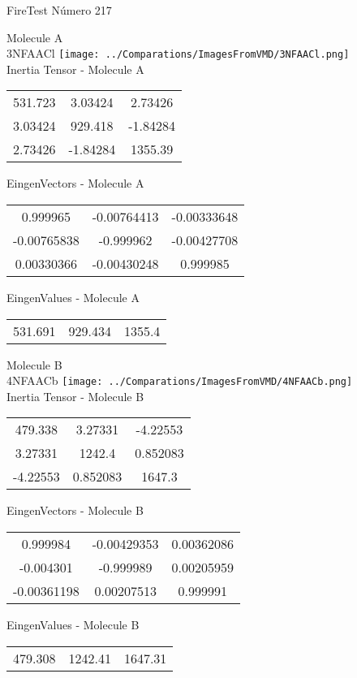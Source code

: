\vtab[-2cm]
\begin{center}
{\large FireTest \tab Número 217}
\end{center}
\begin{multicols}{2}
\begin{center}

Molecule A \\ 
3NFAACl
\texttt{[image: ../Comparations/ImagesFromVMD/3NFAACl.png]}
\\
Inertia Tensor - Molecule A \\
\vtab

\begin{tabular}{|c c c|}
531.723	 & 	3.03424	 & 	2.73426	 \\
3.03424	 & 	929.418	 & 	-1.84284	 \\
2.73426	 & 	-1.84284	 & 	1355.39
\end{tabular}

\vtab
 EingenVectors - Molecule A     \\
\vtab
\begin{tabular}{|c c c|}
0.999965	 & 	-0.00764413	 & 	-0.00333648	 \\
-0.00765838	 & 	-0.999962	 & 	-0.00427708	 \\
0.00330366	 & 	-0.00430248	 & 	0.999985
\end{tabular}

\vtab
 EingenValues - Molecule A     \\
\vtab
\begin{tabular}{|c c c|}
531.691	 & 	929.434	 & 	1355.4	 \\
\end{tabular}
\columnbreak

Molecule B \\ 
4NFAACb
\texttt{[image: ../Comparations/ImagesFromVMD/4NFAACb.png]}
\\
Inertia Tensor - Molecule B \\
\vtab

\begin{tabular}{|c c c|}
479.338	 & 	3.27331	 & 	-4.22553	 \\
3.27331	 & 	1242.4	 & 	0.852083	 \\
-4.22553	 & 	0.852083	 & 	1647.3
\end{tabular}

\vtab
 EingenVectors - Molecule B     \\
\vtab
\begin{tabular}{|c c c|}
0.999984	 & 	-0.00429353	 & 	0.00362086	 \\
-0.004301	 & 	-0.999989	 & 	0.00205959	 \\
-0.00361198	 & 	0.00207513	 & 	0.999991
\end{tabular}

\vtab
 EingenValues - Molecule B     \\
\vtab
\begin{tabular}{|c c c|}
479.308	 & 	1242.41	 & 	1647.31	 \\
\end{tabular}

\end{center}
\end{multicols}
